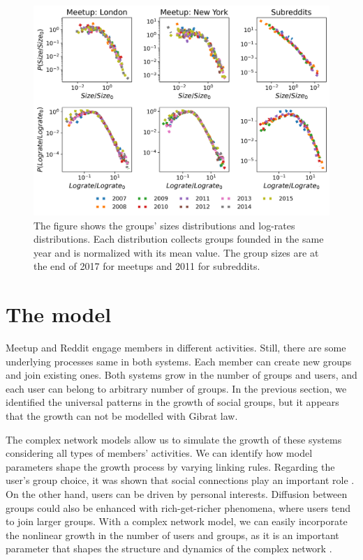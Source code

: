 \begin{figure}[h]
	\centering
	\includegraphics[width=0.8\linewidth]{Figures/figures/Fig1.png}
	\caption[Universality in the Meetup and Reddit groups]{The figure shows the groups' sizes distributions and log-rates distributions. Each distribution collects groups founded in the same year and is normalized with its mean value. The group sizes are at the end of 2017 for meetups and 2011 for subreddits.}
	\label{fig:scale}
\end{figure}

\section{The model}

Meetup and Reddit engage members in different activities. Still, there are some underlying processes same in both systems. Each member can create new groups and join existing ones. Both systems grow in the number of groups and users, and each user can belong to arbitrary number of groups. In the previous section, we identified the universal patterns in the growth of social groups, but it appears that the growth can not be modelled with Gibrat law. 

The complex network models allow us to simulate the growth of these systems considering all types of members' activities. We can identify how model parameters shape the growth process by varying linking rules.
Regarding the user's group choice, it was shown that social connections play an important role \cite{kairam2012life, zheleva2009co}. On the other hand, users can be driven by personal interests. Diffusion between groups could also be enhanced with rich-get-richer phenomena, where users tend to join larger groups. With a complex network model, we can easily incorporate the nonlinear growth in the number of users and groups, as it is an important parameter that shapes the structure and dynamics of the complex network \cite{mitrovic2011quantitative, dankulov2015dynamics, vranic2021growth}.

